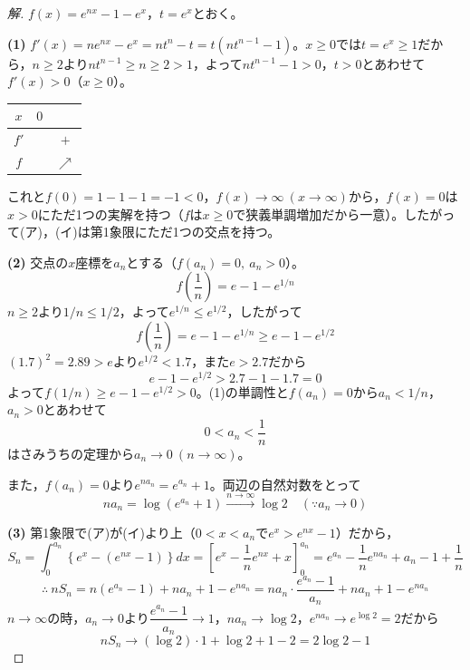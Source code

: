 \documentclass[../main.tex]{subfiles}
\begin{document}
\begin{proof}[解]
  $f(x)=e^{nx}-1-e^x$，$t=e^x$とおく。

  \textbf{(1)} $f'(x)=ne^{nx}-e^x=nt^n-t=t(nt^{n-1}-1)$。$x\ge0$では$t=e^x\ge1$だから，$n\ge2$より$nt^{n-1}\ge n\ge2>1$，よって$nt^{n-1}-1>0$，$t>0$とあわせて$f'(x)>0$（$x\ge0$）。
  \begin{center}
    \begin{tabular}{c|cc}
      $x$ & $0$ & \\
      \hline
      $f'$ & & $+$ \\
      \hline
      $f$ & & $\nearrow$
    \end{tabular}
  \end{center}
  これと$f(0)=1-1-1=-1<0$，$f(x)\to\infty\ (x\to\infty)$から，$f(x)=0$は$x>0$にただ1つの実解を持つ（$f$は$x\ge0$で狭義単調増加だから一意）。したがって(ア)，(イ)は第1象限にただ1つの交点を持つ。

  \textbf{(2)} 交点の$x$座標を$a_n$とする（$f(a_n)=0,\ a_n>0$）。
  \[
    f\left(\frac1n\right)=e-1-e^{1/n}
  \]
  $n\ge2$より$1/n\le1/2$，よって$e^{1/n}\le e^{1/2}$，したがって
  \[
    f\left(\frac1n\right)=e-1-e^{1/n}\ge e-1-e^{1/2}
  \]
  $(1.7)^2=2.89>e$より$e^{1/2}<1.7$，また$e>2.7$だから
  \[
    e-1-e^{1/2}>2.7-1-1.7=0
  \]
  よって$f(1/n)\ge e-1-e^{1/2}>0$。(1)の単調性と$f(a_n)=0$から$a_n<1/n$，$a_n>0$とあわせて
  \[
    0<a_n<\frac1n
  \]
  はさみうちの定理から$a_n\to0\ (n\to\infty)$。

  また，$f(a_n)=0$より$e^{na_n}=e^{a_n}+1$。両辺の自然対数をとって
  \[
    na_n=\log(e^{a_n}+1) \xrightarrow{n\to\infty}\log2 \quad(\because a_n\to0)
  \]

  \textbf{(3)} 第1象限で(ア)が(イ)より上（$0<x<a_n$で$e^x>e^{nx}-1$）だから，
  \[
    S_n=\int_0^{a_n}\left\{e^x-(e^{nx}-1)\right\}dx=\left[e^x-\frac1ne^{nx}+x\right]_0^{a_n}
    =e^{a_n}-\frac1ne^{na_n}+a_n-1+\frac1n
  \]
  \[
    \therefore\ nS_n=n(e^{a_n}-1)+na_n+1-e^{na_n}=na_n\cdot\frac{e^{a_n}-1}{a_n}+na_n+1-e^{na_n}
  \]
  $n\to\infty$の時，$a_n\to0$より$\dfrac{e^{a_n}-1}{a_n}\to1$，$na_n\to\log2$，$e^{na_n}\to e^{\log2}=2$だから
  \[
    nS_n\longrightarrow(\log2)\cdot1+\log2+1-2=2\log2-1
  \]
\end{proof}
\end{document}
